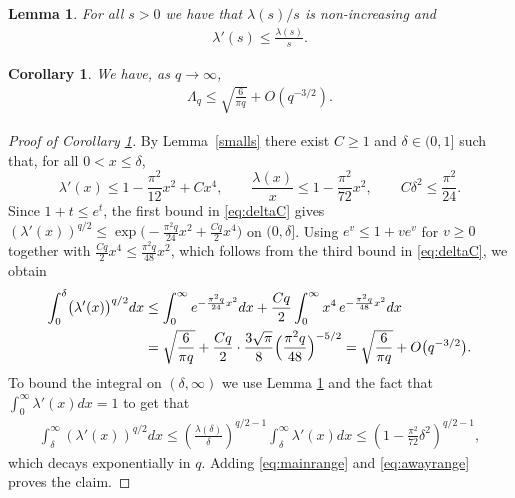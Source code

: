 \documentclass[10pt,a4paper]{amsart}
\newtheorem{lemma}{Lemma}
\newtheorem{corollary}{Corollary}
\begin{document}
\begin{lemma}\label{lambda(s)/s}
For all $s> 0$ we have that $\lambda(s)/s$ is non-increasing and 
    \begin{align*}
   \lambda'(s) \leq \frac{\lambda(s)}{s}.
\end{align*}
\end{lemma}

\begin{corollary}\label{upperbound}
We have, as $q\to\infty$,
\begin{align*}
    \Lambda_q \leq \sqrt{\frac{6}{\pi q}} + O(q^{-3/2}).
\end{align*}
\end{corollary}

\begin{proof}[Proof of Corollary \ref{upperbound}]
    By Lemma~\ref{smalls} there exist $C\geq 1$ and $\delta\in(0,1]$ such that, for all $0<x\leq\delta$,
\begin{equation}\label{eq:deltaC}
\lambda'(x)\leq 1-\frac{\pi^{2}}{12}x^{2}+Cx^{4},
\qquad
\frac{\lambda(x)}{x}\leq 1-\frac{\pi^{2}}{72}x^{2},
\qquad
C\delta^{2}\leq\frac{\pi^{2}}{24}.
\end{equation}
Since $1+t\leq e^{t}$, the first bound in \eqref{eq:deltaC} gives
$(\lambda'(x))^{q/2}\leq \exp\bigl(-\tfrac{\pi^{2}q}{24}x^{2}+\tfrac{Cq}{2}x^{4}\bigr)$
on $(0,\delta]$. Using $e^{v}\leq 1+ve^{v}$ for $v\geq 0$ together with
$\tfrac{Cq}{2}x^{4}\leq \tfrac{\pi^{2}q}{48}x^{2}$, which follows from the third bound
in \eqref{eq:deltaC}, we obtain
\begin{align}
\int_{0}^{\delta}\bigl(\lambda'(x)\bigr)^{q/2}dx
&\leq \int_{0}^{\infty} e^{-\frac{\pi^{2}q}{24}x^{2}}dx
	+\frac{Cq}{2}\int_{0}^{\infty} x^{4}\,e^{-\frac{\pi^{2}q}{48}x^{2}}dx \notag\\
&= \sqrt{\frac{6}{\pi q}}
	+\frac{Cq}{2}\cdot\frac{3\sqrt{\pi}}{8}\Bigl(\frac{\pi^{2}q}{48}\Bigr)^{-5/2}
= \sqrt{\frac{6}{\pi q}}+O\bigl(q^{-3/2}\bigr).
\label{eq:mainrange}
\end{align}
To bound the integral on $(\delta, \infty)$ we use Lemma \ref{lambda(s)/s} and the fact that $\int_{0}^{\infty} \lambda'(x)dx = 1$ to get that
\begin{align}\label{eq:awayrange}
    \int_{\delta}^{\infty}\left(\lambda'(x)\right)^{q/2}dx \leq \left(\frac{\lambda(\delta)}{\delta}\right)^{q/2-1} \int_{\delta}^{\infty} \lambda'(x)dx \leq \left(1-\frac{\pi^2}{72}\delta^2\right)^{q/2-1},
\end{align}
which decays exponentially in $q$.
Adding \eqref{eq:mainrange} and
\eqref{eq:awayrange} proves the claim.
\end{proof}
\end{document}
